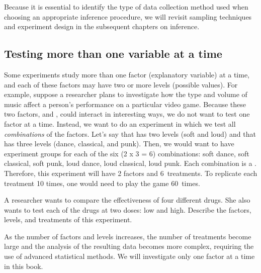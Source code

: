 Because it is essential to identify the type of data collection method used when choosing an appropriate inference procedure, we will revisit sampling techniques and experiment design in the subsequent chapters on inference.





\subsection{Testing more than one variable at a time}

Some experiments study more than one factor (explanatory variable) at a time, and each of these factors may have two or more levels (possible values). For example, suppose a researcher plans to investigate how the type and volume of music affect a person's performance on a particular video game. Because these two factors,  and , could interact in interesting ways, we do not want to test one factor at a time. %
Instead, we want to do an experiment in which
we test all \emph{combinations} of the factors. Let's say that  has two levels (soft and loud) and that  has three levels (dance, classical, and punk). Then, we would want to have experiment groups for each of the six (2 x 3 = 6) combinations: soft dance, soft classical, soft punk, loud dance, loud classical, loud punk. Each combination is a . Therefore, this experiment will have 2 factors and 6~treatments. To replicate each treatment 10 times, one would need to play the game 60~times.

\begin{exercisewrap}
\begin{nexercise}A researcher wants to compare the effectiveness of four different drugs. She also wants to test each of the drugs at two doses: low and high. Describe the factors, levels, and treatments of this experiment.\footnotemark
\end{nexercise}
\end{exercisewrap}

As the number of factors and levels increases, the number of treatments become large and the analysis of the resulting data becomes more complex, requiring the use of advanced statistical methods. We will investigate only one factor at a time in this book.


